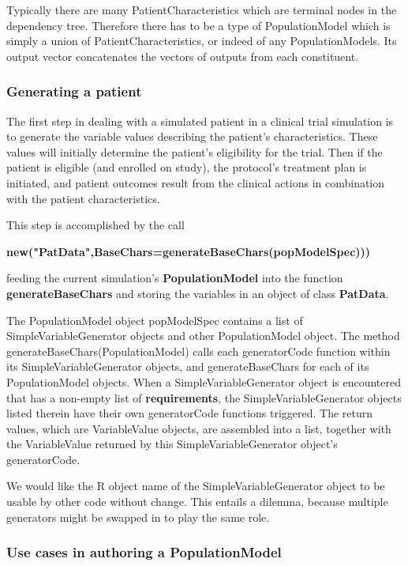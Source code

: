 \documentclass[12pt]{amsart}
\def\code<#1>{\textbf{#1}}
\begin{document}
Typically there are many PatientCharacteristics which are terminal nodes
in the dependency tree.
Therefore there has to be a type of PopulationModel which is simply
a union of PatientCharacteristics, or indeed of any PopulationModels.
Its output vector concatenates the vectors of outputs from each constituent.

\subsubsection{Generating a patient}

The first step in dealing with a simulated patient in a clinical trial simulation
is to generate the variable values describing the patient's characteristics.
These values will initially determine the patient's eligibility for the trial.
Then if the patient is eligible (and enrolled on study),
the protocol's treatment plan is initiated,
and patient outcomes result from the clinical actions in combination with the
patient characteristics.

This step is accomplished by the call

             \code<new("PatData",BaseChars=generateBaseChars(popModelSpec)))  >

feeding the current simulation's \code<PopulationModel>
into the function \code<generateBaseChars>
and storing the variables in an object of class \code<PatData>.

The PopulationModel object popModelSpec contains a list
of SimpleVariableGenerator objects and other PopulationModel object.
The method generateBaseChars(PopulationModel)  calls each 
generatorCode function within its SimpleVariableGenerator objects,
and generateBaseChars for each of its PopulationModel objects.
When a SimpleVariableGenerator object
is encountered that has a non-empty list of \code<requirements>,
the SimpleVariableGenerator objects listed therein have their own
generatorCode functions triggered. The return values, which are
VariableValue objects, are assembled into a list, together with the
VariableValue returned by this SimpleVariableGenerator object's
generatorCode.

We would like the R object name of the SimpleVariableGenerator object
to be usable by other code without change.
This entails a dilemma, because multiple generators might be swapped in
to play the same role.

\subsubsection{Use cases in authoring a PopulationModel}
\end{document}
